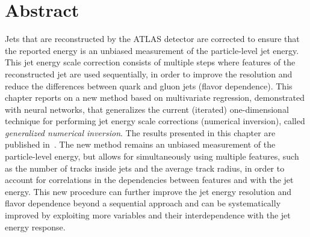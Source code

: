 \section{Abstract}
Jets that are reconstructed by the ATLAS detector are corrected to ensure that the reported energy is an unbiased measurement of the particle-level jet energy.
This jet energy scale correction consists of multiple steps where features of the reconstructed jet are used sequentially, in order to improve the resolution and reduce the differences between quark and gluon jets (flavor dependence).
This chapter reports on a new method based on multivariate regression, demonstrated with neural networks, that generalizes the current (iterated) one-dimensional technique for performing jet energy scale corrections (numerical inversion), called \textit{generalized numerical inversion}.
The results presented in this chapter are published in~\cite{ATL-PHYS-PUB-2018-013}.
The new method remains an unbiased measurement of the particle-level energy, but allows for simultaneously using multiple features, such as the number of tracks inside jets and the average track radius, in order to account for correlations in the dependencies between features and with the jet energy.
This new procedure can further improve the jet energy resolution and flavor dependence beyond a sequential approach and can be systematically improved by exploiting more variables and their interdependence with the jet energy response.

